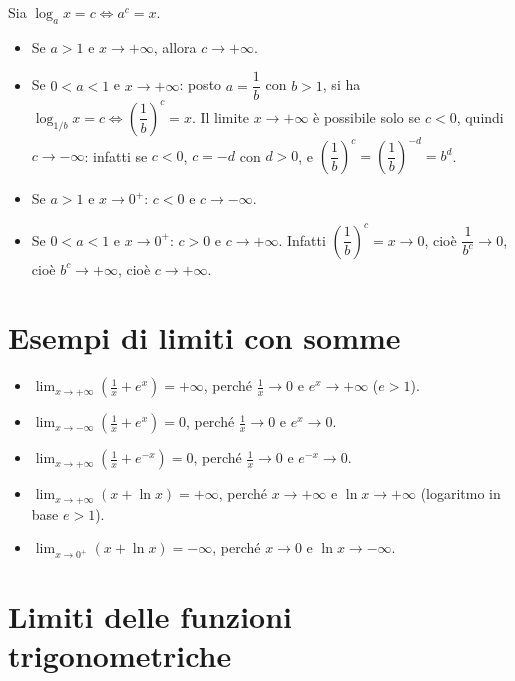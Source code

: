 \documentclass[11pt,a4paper]{article}
\begin{document}
\begin{esempio}
Sia $\log_a x = c \iff a^c = x$.
\begin{itemize}
  \item Se $a > 1$ e $x \to +\infty$, allora $c \to +\infty$.
  \item Se $0 < a < 1$ e $x \to +\infty$: posto $a = \dfrac{1}{b}$ con $b > 1$, si ha $\log_{1/b} x = c \iff \left(\dfrac{1}{b}\right)^c = x$. Il limite $x \to +\infty$ è possibile solo se $c < 0$, quindi $c \to -\infty$: infatti se $c < 0$, $c = -d$ con $d > 0$, e $\left(\dfrac{1}{b}\right)^c = \left(\dfrac{1}{b}\right)^{-d} = b^d$.
  \item Se $a > 1$ e $x \to 0^+$: $c < 0$ e $c \to -\infty$.
  \item Se $0 < a < 1$ e $x \to 0^+$: $c > 0$ e $c \to +\infty$. Infatti $\left(\dfrac{1}{b}\right)^c = x \to 0$, cioè $\dfrac{1}{b^c} \to 0$, cioè $b^c \to +\infty$, cioè $c \to +\infty$.
\end{itemize}
\end{esempio}

\section{Esempi di limiti con somme}

\begin{esempio}
\begin{itemize}
  \item $\displaystyle\lim_{x\to+\infty}\left(\frac{1}{x} + e^x\right) = +\infty$, perché $\frac{1}{x} \to 0$ e $e^x \to +\infty$ ($e > 1$).
  \item $\displaystyle\lim_{x\to-\infty}\left(\frac{1}{x} + e^x\right) = 0$, perché $\frac{1}{x} \to 0$ e $e^x \to 0$.
  \item $\displaystyle\lim_{x\to+\infty}\left(\frac{1}{x} + e^{-x}\right) = 0$, perché $\frac{1}{x} \to 0$ e $e^{-x} \to 0$.
  \item $\displaystyle\lim_{x\to+\infty}\left(x + \ln x\right) = +\infty$, perché $x \to +\infty$ e $\ln x \to +\infty$ (logaritmo in base $e > 1$).
  \item $\displaystyle\lim_{x\to 0^+}\left(x + \ln x\right) = -\infty$, perché $x \to 0$ e $\ln x \to -\infty$.
\end{itemize}
\end{esempio}

\section{Limiti delle funzioni trigonometriche}
\end{document}
